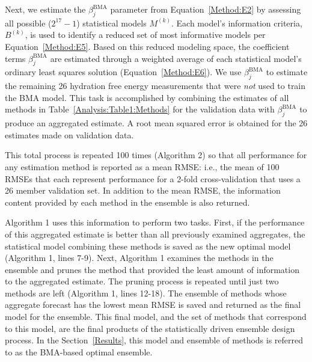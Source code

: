 \documentclass[12pt]{article}
\newcommand{\+}[1]{\ensuremath{\mathbf{#1}}}
\begin{document}
Next, we estimate the $\beta_j^{\text{BMA}}$ parameter from Equation~\ref{Method:E2} by assessing all possible ($2^{17} -1$) statistical models $M^{(k)}$. Each model's information criteria, $B^{(k)}$,  is used to identify a reduced set of most informative models per Equation~\ref{Method:E5}. Based on this reduced modeling space, the coefficient terms $\beta_j^{\text{BMA}}$ are estimated through a weighted average of each statistical model's ordinary least squares solution (Equation~\ref{Method:E6}).  We use $\beta_j^{\text{BMA}}$ to estimate the remaining 26 hydration free energy measurements that were \emph{not} used to train the BMA model.  This task is accomplished by combining the estimates of all methods in Table~\ref{Analysis:Table1:Methods} for the validation data with  $\beta_j^{\text{BMA}}$ to produce an aggregated estimate.  A root mean squared error is obtained for the 26 estimates made on validation data.

This total process is repeated 100 times (Algorithm 2) so that all performance for any estimation method is reported as a mean RMSE: i.e., the mean of 100 RMSEs that each represent performance for a 2-fold cross-validation that uses a 26 member validation set. In addition to the mean RMSE, the information content provided by each method in the ensemble is also returned. 

Algorithm 1 uses this information to perform two tasks.  First, if the performance of this aggregated estimate is better than all previously examined aggregates, the statistical model combining these methods is saved as the new optimal model (Algorithm 1, lines 7-9). Next, Algorithm 1 examines the methods in the ensemble and prunes the method that provided the least amount of information to the aggregated estimate. The pruning process is repeated until just two methods are left (Algorithm 1, lines 12-18).  The ensemble of methods whose aggregate forecast has the lowest mean RMSE is saved and returned as the final model for the ensemble. This final model, and the set of methods that correspond to this model, are the final products of the statistically driven ensemble design process. In the Section~\ref{Results}, this model and ensemble of methods is referred to as the BMA-based optimal ensemble.
\end{document}
